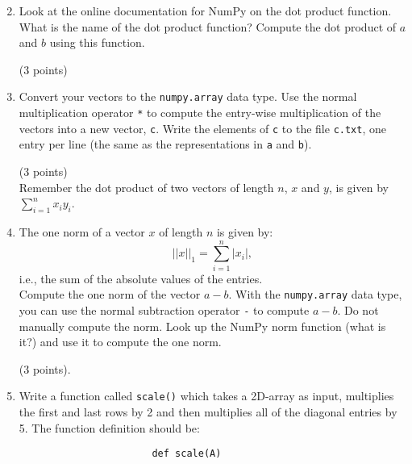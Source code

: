 \documentclass{article}
\newcommand{\ssum}[3]{\displaystyle\sum\limits_{#1}^{#2} #3}
\newcounter{points}
\newcommand\setpoints[1]{\addtocounter{points}{#1}(#1 points)}
\begin{document}
\begin{enumerate}
\begin{enumerate}
\setcounter{enumii}{1}
\item Look at the online documentation for NumPy on the dot product function.  What is the name of the dot product function?  Compute the dot product of $a$ and $b$ using this function. \setpoints{3}
\end{enumerate}

\begin{enumerate}
\setcounter{enumii}{2}
\item Convert your vectors to the \texttt{numpy.array} data type.  Use the normal multiplication operator \texttt{*} to compute the entry-wise multiplication of the vectors into a new vector, \texttt{c}.  Write the elements of \texttt{c} to the file \texttt{c.txt}, one entry per line (the same as the representations in \texttt{a} and \texttt{b}). \setpoints{3} \\

Remember the dot product of two vectors of length $n$, $x$ and $y$, is given by $\ssum{i=1}{n}{x_iy_i}$.
\end{enumerate}

\begin{enumerate}
\setcounter{enumii}{3}
\item The one norm of a vector $x$ of length $n$ is given by:
\[
||x||_1 = \ssum{i=1}{n}{|x_i|},
\]
 i.e., the sum of the absolute values of the entries. \\

Compute the one norm of the vector $a - b$.  With the \texttt{numpy.array} data type, you can use the normal subtraction operator \texttt{-} to compute $a - b$.  Do not manually compute the norm.  Look up the NumPy norm function (what is it?) and use it to compute the one norm. \setpoints{3}.
\end{enumerate}

\begin{enumerate}
\setcounter{enumii}{4}
\item Write a function called \texttt{scale()} which takes a 2D-array as input, multiplies the first and last rows by 2 and then multiplies all of the diagonal entries by 5.  The function definition should be:

\vspace{0.2in}

\begin{lstlisting}
                       def scale(A)
\end{lstlisting}

\vspace{0.2in}


\end{enumerate}
\end{enumerate}
\end{document}
